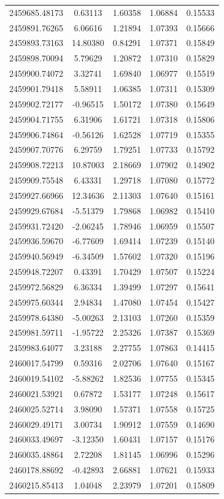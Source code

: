 \documentclass[traditabstract,longauth]{aa}
\begin{document}
\begin{longtable}{lcccc}
2459685.48173 & 0.63113 & 1.60358 & 1.06884 & 0.15533\\
2459891.76265 & 6.06616 & 1.21894 & 1.07393 & 0.15666\\
2459893.73163 & 14.80380 & 0.84291 & 1.07371 & 0.15849\\
2459898.70094 & 5.79629 & 1.20872 & 1.07310 & 0.15829\\
2459900.74072 & 3.32741 & 1.69840 & 1.06977 & 0.15519\\
2459901.79418 & 5.58911 & 1.06385 & 1.07311 & 0.15309\\
2459902.72177 & -0.96515 & 1.50172 & 1.07380 & 0.15649\\
2459904.71755 & 6.31906 & 1.61721 & 1.07318 & 0.15806\\
2459906.74864 & -0.56126 & 1.62528 & 1.07719 & 0.15355\\
2459907.70776 & 6.29759 & 1.79251 & 1.07733 & 0.15792\\
2459908.72213 & 10.87003 & 2.18669 & 1.07902 & 0.14902\\
2459909.75548 & 6.43331 & 1.29718 & 1.07080 & 0.15772\\
2459927.66966 & 12.34636 & 2.11303 & 1.07640 & 0.15161\\
2459929.67684 & -5.51379 & 1.79868 & 1.06982 & 0.15410\\
2459931.72420 & -2.06245 & 1.78946 & 1.06959 & 0.15507\\
2459936.59670 & -6.77609 & 1.69414 & 1.07239 & 0.15140\\
2459940.56949 & -6.34509 & 1.57602 & 1.07320 & 0.15196\\
2459948.72207 & 0.43391 & 1.70429 & 1.07507 & 0.15224\\
2459972.56829 & 6.36334 & 1.39499 & 1.07297 & 0.15641\\
2459975.60344 & 2.94834 & 1.47080 & 1.07454 & 0.15427\\
2459978.64380 & -5.00263 & 2.13103 & 1.07260 & 0.15359\\
2459981.59711 & -1.95722 & 2.25326 & 1.07387 & 0.15369\\
2459983.64077 & 3.23188 & 2.27755 & 1.07863 & 0.14415\\
2460017.54799 & 0.59316 & 2.02706 & 1.07640 & 0.15167\\
2460019.54102 & -5.88262 & 1.82536 & 1.07755 & 0.15345\\
2460021.53921 & 0.67872 & 1.53177 & 1.07248 & 0.15617\\
2460025.52714 & 3.98090 & 1.57371 & 1.07558 & 0.15725\\
2460029.49171 & 3.00734 & 1.90912 & 1.07559 & 0.14690\\
2460033.49697 & -3.12350 & 1.60431 & 1.07157 & 0.15176\\
2460035.48864 & 2.72208 & 1.81145 & 1.06996 & 0.15296\\
2460178.88692 & -0.42893 & 2.66881 & 1.07621 & 0.15933\\
2460215.85413 & 1.04048 & 2.23979 & 1.07201 & 0.15809\\
\hline

\end{longtable}
\end{document}
